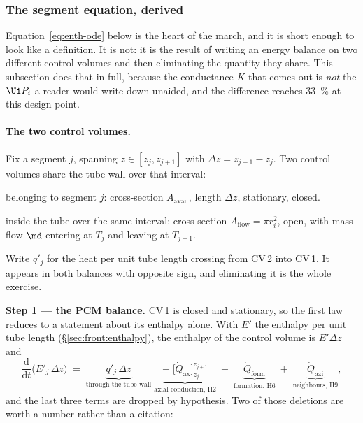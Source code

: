 \subsubsection{The segment equation, derived}
\label{sec:front:segeq}

Equation~\eqref{eq:enth-ode} below is the heart of the march, and it is short
enough to look like a definition. It is not: it is the result of writing an
energy balance on two different control volumes and then eliminating the
quantity they share. This subsection does that in full, because the conductance
$K$ that comes out is \emph{not} the $\Ui P_{i}$ a reader would write down
unaided, and the difference reaches \SI{33}{\percent} at this design point.

\paragraph{The two control volumes.}
Fix a segment $j$, spanning $z\in[z_{j},z_{j+1}]$ with $\Delta z =
z_{j+1}-z_{j}$. Two control volumes share the tube wall over that interval:

\begin{description}[leftmargin=1.9em,itemsep=2pt]
\item[CV\,1 --- the PCM] belonging to segment $j$: cross-section
  $A_{\mathrm{avail}}$, length $\Delta z$, stationary, closed.
\item[CV\,2 --- the fluid] inside the tube over the same interval:
  cross-section $A_{\mathrm{flow}}=\pi r_{i}^{2}$, open, with mass flow $\md$
  entering at $T_{j}$ and leaving at $T_{j+1}$.
\end{description}

\noindent
Write $q'_{j}$ for the heat per unit tube length crossing from CV\,2 into
CV\,1. It appears in both balances with opposite sign, and eliminating it is
the whole exercise.

\medskip
\noindent\textbf{Step 1 --- the PCM balance.}
CV\,1 is closed and stationary, so the first law reduces to a statement about
its enthalpy alone. With $E'$ the enthalpy per unit tube length
(\S\ref{sec:front:enthalpy}), the enthalpy of the control volume is
$E'\Delta z$ and
\begin{equation}
  \frac{\mathrm{d}}{\mathrm{d}t}\bigl(E'_{j}\,\Delta z\bigr)
  \;=\;
  \underbrace{q'_{j}\,\Delta z}_{\text{through the tube wall}}
  \;\underbrace{-\;\bigl[\dot Q_{\mathrm{ax}}\bigr]_{z_{j}}^{z_{j+1}}}
              _{\text{axial conduction, H2}}
  \;+\;\underbrace{\dot Q_{\mathrm{form}}}_{\text{formation, H6}}
  \;+\;\underbrace{\dot Q_{\mathrm{azi}}}_{\text{neighbours, H9}} ,
\end{equation}
and the last three terms are dropped by hypothesis. Two of those deletions are
worth a number rather than a citation:

